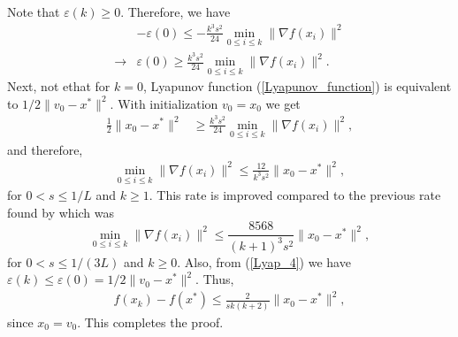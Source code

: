 \documentclass{article}
\theoremstyle{plain}
\theoremstyle{definition}
\theoremstyle{remark}
\begin{document}
Note that $\varepsilon(k)\geq 0$. Therefore, we have
\begin{align}\label{Lyap_5}
   & -\varepsilon(0) \leq -\frac{k^3s^2}{24}\min_{0\leq i\leq k}\|\nabla f(x_i)\|^2\nonumber\\
    \rightarrow & \varepsilon(0)\geq \frac{k^3s^2}{24}\min_{0\leq i\leq k}\|\nabla f(x_i)\|^2.
\end{align}
Next, not ethat for $k=0$, Lyapunov function (\ref{Lyapunov_function}) is equivalent to $1/2\|v_0-x^*\|^2$. With initialization $v_0=x_0$ we get
\begin{align}\label{Lyap_6}
    \frac{1}{2}\|x_0-x^*\|^2&\geq \frac{k^3s^2}{24}\min_{0\leq i\leq k}\|\nabla f(x_i)\|^2,
\end{align}
and therefore,
\begin{align}\label{Lyap_7}
    \min_{0\leq i\leq k}\|\nabla f(x_i)\|^2 \leq \frac{12}{k^3s^2}\|x_0-x^*\|^2,
\end{align}
for $0< s\leq 1/L$ and $k\geq 1$. This rate is improved compared to the previous rate found by \cite{Shi2021UnderstandingTA} which was 
$$ \min_{0\leq i\leq k}\|\nabla f(x_i)\|^2 \leq \frac{8568}{(k+1)^3s^2}\|x_0-x^*\|^2,$$
for $0< s\leq 1/(3L)$ and $k\geq0$.
Also, from (\ref{Lyap_4}) we have $\varepsilon(k)\leq \varepsilon(0) = 1/2\|v_0-x^*\|^2$. Thus,
\begin{align}\label{Lyap_8}
    f(x_k)-f(x^*)\leq \frac{2}{sk(k+2)}\|x_0-x^*\|^2,
\end{align}
since $x_0=v_0$. This completes the proof.
\end{document}

